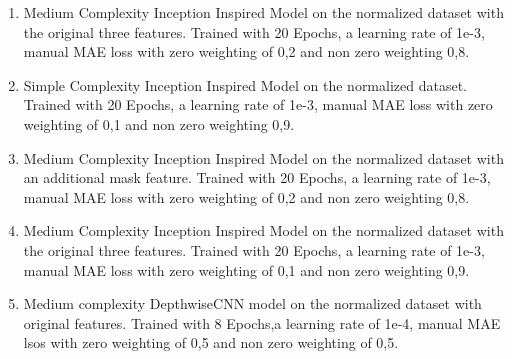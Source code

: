 \begin{enumerate}
	\item Medium Complexity Inception Inspired Model on the normalized dataset with the original three features. Trained with 20 Epochs, a learning rate of 1e-3, manual MAE loss with zero weighting of 0,2 and non zero weighting 0,8.
	\item Simple Complexity Inception Inspired Model on the normalized dataset. Trained with 20 Epochs, a learning rate of 1e-3, manual MAE loss with zero weighting of 0,1 and non zero weighting 0,9.
	\item Medium Complexity Inception Inspired Model on the normalized dataset with an additional mask feature. Trained with 20 Epochs, a learning rate of 1e-3, manual MAE loss with zero weighting of 0,2 and non zero weighting 0,8.
	\item Medium Complexity Inception Inspired Model on the normalized dataset with the original three features. Trained with 20 Epochs, a learning rate of 1e-3, manual MAE loss with zero weighting of 0,1 and non zero weighting 0,9.
	\item Medium complexity DepthwiseCNN model on the normalized dataset with original features. Trained with 8 Epochs,a learning rate of 1e-4, manual MAE lsos with zero weighting of 0,5 and non zero weighting of 0,5.
\end{enumerate}

